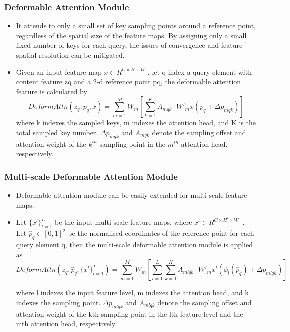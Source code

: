 \subsubsection{Deformable Attention Module} 
\begin{itemize}
	\item It attends to only a small set of key sampling points around a reference point, regardless of the spatial size of the feature maps. By assigning only a small fixed number of keys for each query, the issues of convergence and feature spatial resolution can be mitigated.
	\item Given an input feature map $x \in R^{C\times H \times W}$ , let q index a query element with content feature zq and a 2-d reference point pq, the deformable attention feature is calculated by
	$$ DeformAttn(z_q, p_q, x) = \displaystyle\sum\limits_{m=1}^M W_m
	[\displaystyle\sum\limits_{k=1}^K A_{mqk}\cdot W'_mx(p_q+\Delta p_{mqk})]
	$$
	where k indexes the sampled keys, m indexes the attention head, and K is the total sampled key number. $\Delta p_{mqk}$ and $A_{mqk}$ denote the sampling offset and attention weight of the $k^{th}$ sampling point in the $m^{th}$ attention head, respectively.
\end{itemize}

\subsubsection{Multi-scale Deformable Attention Module}
\begin{itemize}
	\item Deformable attention module can be easily extended for multi-scale feature maps.  
	\item Let $\{{x^l}\}_{l=1}^L$ be the input multi-scale feature maps, where  $x^l \in R^{C\times H^l \times W^l}$ . Let $ \hat p_q \in [0, 1]^2$ be the normalised coordinates of the reference point for each query element q, then the multi-scale deformable attention module is applied as 
	$$DeformAttn(z_q, \hat{p}_q, \{{x^l}\}_{l=1}^L) = 
	\displaystyle\sum\limits_{m=1}^M W_m
	[\displaystyle\sum\limits_{l=1}^L\displaystyle\sum\limits_{k=1}^K A_{mlqk}\cdot W'_mx^l(\phi _l (\hat p_q)+\Delta p_{mlqk})]$$
	
	where l indexes the input feature level, m indexes the attention head, and k indexes the sampling point. $\Delta p_{mlqk}$ and $A_{mlqk}$ denote the sampling offset and attention weight of the kth sampling point in the lth feature level and the mth attention head, respectively
\end{itemize}

